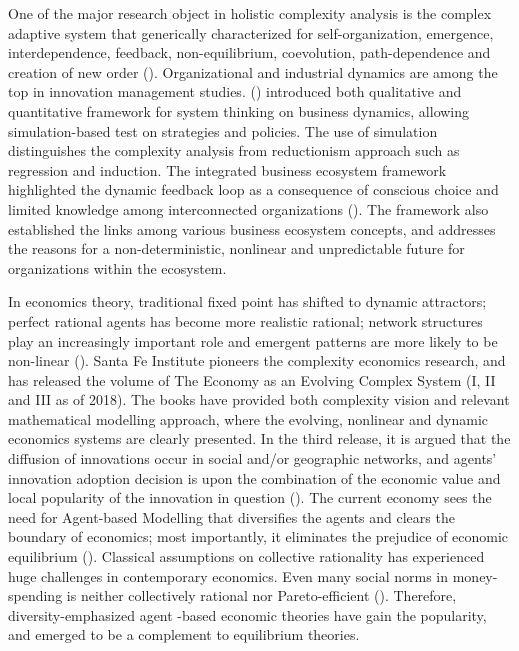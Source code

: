 \documentclass[utf8,english]{gradu3}
\begin{document}
One of the major research object in holistic complexity analysis is the complex adaptive system that generically characterized for self-organization, emergence, interdependence, feedback, non-equilibrium, coevolution, path-dependence and creation of new order (\cite{mitleton2003complex}). Organizational and industrial dynamics are among the top in innovation management studies. \citeauthor{jung2014structure} (\citeyear{jung2014structure}) introduced both qualitative and quantitative framework for system thinking on business dynamics, allowing simulation-based test on strategies and policies. The use of simulation distinguishes the complexity analysis from reductionism approach such as regression and induction. The integrated business ecosystem framework highlighted the dynamic feedback loop as a consequence of conscious choice and limited knowledge among interconnected organizations (\cite{peltoniemi2006preliminary}). The framework also established the links among various business ecosystem concepts, and addresses the reasons for a non-deterministic, nonlinear and unpredictable future for organizations within the ecosystem.

In economics theory, traditional fixed point has shifted to dynamic attractors; perfect rational agents has become more realistic rational; network structures play an increasingly important role and emergent patterns are more likely to be non-linear (\cite{beinhocker2006origin}). Santa Fe Institute pioneers the complexity economics research, and has released the volume of The Economy as an Evolving Complex System (I, II and III as of 2018). The books have provided both complexity vision and relevant mathematical modelling approach, where the evolving, nonlinear and dynamic economics systems are clearly presented. In the third release, it is argued that the diffusion of innovations occur in social and/or geographic networks, and agents' innovation adoption decision is upon the combination of the economic value and local popularity of the innovation in question (\cite{young2006diffusion}). The current economy sees the need for Agent-based Modelling that diversifies the agents and clears the boundary of economics; most importantly, it eliminates the prejudice of economic equilibrium (\cite{farmer2009economy}). Classical assumptions on collective rationality has experienced huge challenges in contemporary economics. Even many social norms  in money-spending is neither collectively rational nor Pareto-efficient (\cite{elster1989social}). Therefore, diversity-emphasized agent -based economic theories have gain the popularity, and emerged to be a complement to equilibrium theories. 
\end{document}
